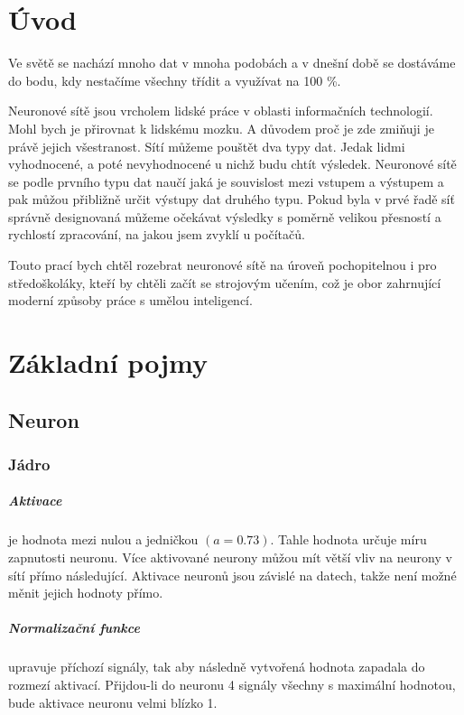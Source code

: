 \documentclass[12pt,a4paper]{report}
\begin{document}


\tableofcontents

\chapter{Úvod}
Ve světě se nachází mnoho dat v mnoha podobách a v dnešní době se dostáváme do bodu, kdy nestačíme všechny třídit a využívat na 100 \%.

Neuronové sítě jsou vrcholem lidské práce v oblasti informačních technologií. Mohl bych je přirovnat k lidskému mozku. A důvodem proč je zde zmiňuji je právě jejich všestranost. Sítí můžeme pouštět dva typy dat. Jedak lidmi vyhodnocené, a poté nevyhodnocené u nichž budu chtít výsledek. Neuronové sítě se podle prvního typu dat naučí jaká je souvislost mezi vstupem a výstupem a pak můžou přibližně určit výstupy dat druhého typu. Pokud byla v prvé řadě síť správně designovaná můžeme očekávat výsledky s poměrně velikou přesností a rychlostí zpracování, na jakou jsem zvyklí u počítačů.

Touto prací bych chtěl rozebrat neuronové sítě na úroveň pochopitelnou i pro středoškoláky, kteří by chtěli začít se strojovým učením, což je obor zahrnující moderní způsoby práce s umělou inteligencí.

\chapter{Základní pojmy} %

\section{Neuron}
	\subsection{Jádro}
		\paragraph{Aktivace}
		je hodnota mezi nulou a jedničkou $(a=0.73)$. Tahle hodnota určuje míru zapnutosti neuronu. Více aktivované neurony můžou mít větší vliv na neurony v sítí přímo následující. Aktivace neuronů jsou závislé na datech, takže není možné měnit jejich hodnoty přímo.
		\paragraph{Normalizační funkce}
		upravuje příchozí signály, tak aby následně vytvořená hodnota zapadala do rozmezí aktivací. Přijdou-li do neuronu 4 signály všechny s maximální hodnotou, bude aktivace neuronu velmi blízko 1.
\end{document}
